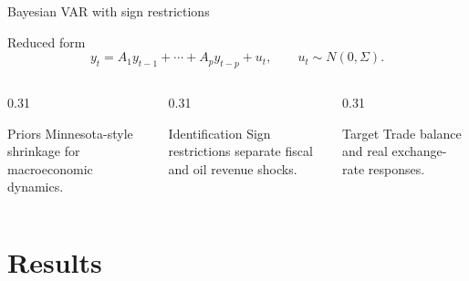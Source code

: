 \documentclass[aspectratio=169,10pt]{beamer}
\begin{document}
\begin{frame}{Bayesian VAR with sign restrictions}
  \begin{block}{Reduced form}
    \[
      y_t = A_1 y_{t-1} + \cdots + A_p y_{t-p} + u_t,
      \qquad u_t \sim N(0,\Sigma).
    \]
  \end{block}

  \vspace{0.2cm}

  \begin{columns}[T,onlytextwidth]
    \begin{column}{0.31\textwidth}
      \begin{exampleblock}{Priors}
        Minnesota-style shrinkage for macroeconomic dynamics.
      \end{exampleblock}
    \end{column}
    \begin{column}{0.31\textwidth}
      \begin{exampleblock}{Identification}
        Sign restrictions separate fiscal and oil revenue shocks.
      \end{exampleblock}
    \end{column}
    \begin{column}{0.31\textwidth}
      \begin{alertblock}{Target}
        Trade balance and real exchange-rate responses.
      \end{alertblock}
    \end{column}
  \end{columns}
\end{frame}

\section{Results}
\end{document}
